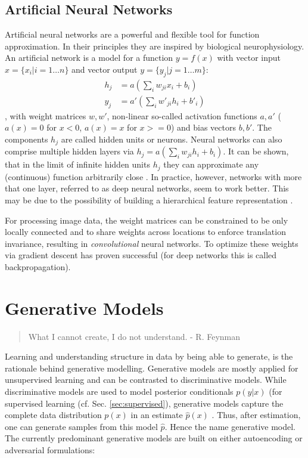 	\subsection{Artificial Neural Networks}\label{sec:neuralnetworks}
		Artificial neural networks are a powerful and flexible tool for function approximation. In their principles they are inspired by biological neurophysiology. An artificial network is a model for a function $y = f(x)$ with vector input $x = \{ x_i | i = 1 \ldots n \}$ and vector output $y = \{ y_j | j = 1 \ldots m \}$:
		\begin{equation} \label{eq1}
			\begin{split}
				h_j & =  a (\sum_i w_{ji} x_i + b_i)  \\
				y_j & =  a' (\sum_i w'_{ji} h_i + b'_i)
			\end{split}
		\end{equation},
		with weight matrices $w, w'$, non-linear so-called activation functions $a, a'$ (\eg $a(x)=0$ for $x<0$, $a(x)=x$ for $x>=0$) and bias vectors $b, b'$.
		The components $h_j$ are called hidden units or neurons. Neural networks can also comprise multiple hidden layers via $h_j  =  a (\sum_i w_{ji} h_i + b_i)$.
		It can be shown, that in the limit of infinite hidden units $h_j$ they can approximate any (continuous) function arbitrarily close \cite{cybenko89approx, hornik91approx}.
		In practice, however, networks with more that one layer, referred to as deep neural networks, seem to work better. This may be due to the possibility of building a hierarchical feature representation \cite{zeiler14vis}.

		For processing image data, the weight matrices can be constrained to be only locally connected and to share weights across locations to enforce translation invariance, resulting in \textit{convolutional} neural networks.
		To optimize these weights via gradient descent has proven successful (for deep networks this is called backpropagation).

\section{Generative Models}\label{sec:genmodel}
	\begin{quote}
	    What I cannot create, I do not understand. - R. Feynman
	\end{quote}
	Learning and understanding structure in data by being able to generate, is the rationale behind generative modelling.
	Generative models are mostly applied for unsupervised learning and can be contrasted to discriminative models. While discriminative models are used to model posterior conditionals $p(y|x)$ (\eg for supervised learning (cf. Sec. \ref{sec:supervised}), generative models capture the complete data distribution $p(x)$ in an estimate $\hat p(x)$ \cite{bishop06pattern}. Thus, after estimation, one can generate samples from this model $\hat p$. Hence the name generative model.
	The currently predominant generative models are built on either autoencoding or adversarial formulations:

